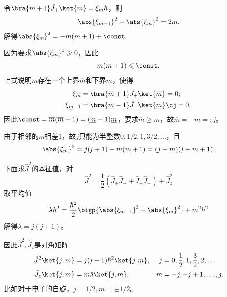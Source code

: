 令$\bra{m+1}\hat J_+\ket{m}=\xi_m\hbar$，则 
\[
	\abs{\xi_{m-1}}^2-\abs{\xi_m}^2=2m.
\]
解得$\abs{\xi_m}^2=-m(m+1)+\const.$

因为要求$\abs{\xi_m}^2\geqslant 0$，因此 
\[
m(m+1)\leqslant\const.
\]
上式说明$m$存在一个上界$\overline m$和下界$\underline m$，使得
\begin{align*}
	\xi_{\overline m}&=\bra{\overline m+1}\hat J_+\ket{\overline m}=0;\\
	\xi_{\underline m-1}&=\bra{\underline m-1}\hat J_-\ket{\underline m}\cj=0.
\end{align*}
因此$\const=\overline m(\overline m+1)=(\underline m-1)\underline m$，要求$\overline m\geq\underline m$，故$\overline m=-\underline m=:j$。

由于相邻的$m$相差1，故$j$只能为半整数$0, 1/2, 1, 3/2, \ldots$，且
\[
	\abs{\xi_m}^2=j(j+1)-m(m+1)=(j-m)(j+m+1).
\]

下面求$\hat J^2$的本征值，对
\[
	\hat J^2=\frac12(\hat J_+\hat J_-+\hat J_-\hat J_+)+\hat J_z^2
\]
取平均值
\[
	\lambda\hbar^2=\frac{\hbar^2}2\bigp{\abs{\xi_{m-1}}^2+\abs{\xi_m}^2}+m^2\hbar^2
\]
解得$\lambda=j(j+1)$。

因此$\hat J^2,\hat J_z$是对角矩阵
\begin{align}
	\hat J^2\ket{j,m}&=j(j+1)\hbar^2\ket{j,m},&j&=0,\frac12,1,\frac32,2,\ldots\\
	\hat J_z\ket{j,m}&=m\hbar\ket{j,m},&m&=-j,-j+1,\ldots,j.
\end{align}
比如对于电子的自旋，$j=1/2,m=\pm 1/2$。

